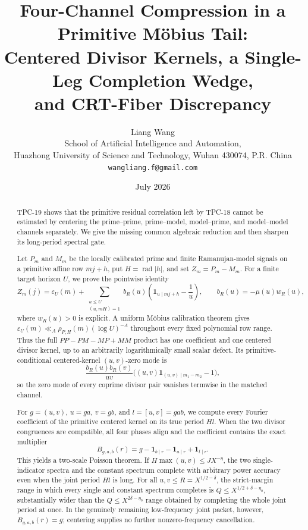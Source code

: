 \documentclass[11pt]{article}
\title{\textbf{Four-Channel Compression in a Primitive M\"obius Tail:}\\
\textbf{Centered Divisor Kernels, a Single-Leg Completion Wedge,}\\
\textbf{and CRT-Fiber Discrepancy}}
\author{Liang Wang\\
\small School of Artificial Intelligence and Automation,\\[-0.2em]
\small Huazhong University of Science and Technology, Wuhan 430074, P.R. China\\
\small \texttt{wangliang.f@gmail.com}}
\date{July 2026}
\theoremstyle{definition}
\theoremstyle{remark}
\newcommand{\one}{\mathbf 1}
\newcommand{\eps}{\varepsilon}
\newcommand{\rad}{\operatorname{rad}}
\begin{document}
\maketitle

\begin{abstract}
TPC-19 shows that the primitive residual correlation left by TPC-18
cannot be estimated by centering the prime--prime, prime--model, model--prime,
and model--model channels separately.  We give the missing common
algebraic reduction and then sharpen its long-period spectral gate.

Let \(P_m\) and \(M_m\) be the locally calibrated prime and finite
Ramanujan-model signals on a primitive affine row \(mj+h\), put
\(H=\rad|h|\), and set \(Z_m=P_m-M_m\).  For a finite target horizon
\(U\), we prove the
pointwise identity
\[
 Z_m(j)=\eps_U(m)+
 \sum_{\substack{u\le U\\(u,mH)=1}}
 b_R(u)\left(\one_{u\mid mj+h}-\frac1u\right),
 \qquad b_R(u)=-\mu(u)w_R(u),
\]
where \(w_R(u)>0\) is explicit.  A uniform M\"obius calibration
theorem gives \(\eps_U(m)\ll_A \rho_{P,H}(m)(\log U)^{-A}\) throughout
every fixed polynomial row range.  Thus the full
\(PP-PM-MP+MM\) product has one coefficient and one centered divisor
kernel, up to an arbitrarily logarithmically small scalar defect.  Its
primitive-conditional centered-kernel \((u,v)\)-zero mode is
\[
 \frac{b_R(u)b_R(v)}{uv}
 \bigl((u,v)\one_{(u,v)\mid m_1-m_2}-1\bigr),
\]
so the zero mode of every coprime divisor pair vanishes termwise in the
matched channel.

For \(g=(u,v)\), \(u=ga\), \(v=gb\), and
\(l=[u,v]=gab\), we compute every Fourier coefficient of the primitive
centered kernel on its true period \(Hl\).  When
the two divisor congruences are compatible, all four phases align and
the coefficient contains the exact multiplier
\[
 B_{g,a,b}(r)=g-\one_{b\mid r}-\one_{a\mid r}+\one_{l\mid r}.
\]
This yields a two-scale Poisson theorem.  If
\(H\max(u,v)\le JX^{-\eta}\), the two single-indicator spectra and the
constant spectrum complete with arbitrary power accuracy even when
the joint period \(Hl\) is long.  For all \(u,v\le R=X^{1/2-\delta}\),
the strict-margin range in which every single and constant spectrum
completes is
\(Q\le X^{1/2+\delta-\eta_0}\), substantially wider than the
\(Q\le X^{2\delta-\eta_0}\) range obtained by completing the whole
joint period at once.  In the genuinely remaining low-frequency
joint packet, however, \(B_{g,a,b}(r)=g\); centering supplies no further
nonzero-frequency cancellation.


\end{abstract}
\end{document}
